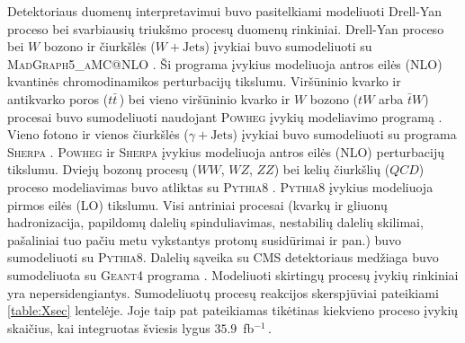 \documentclass[a4paper, 12pt, oneside]{article}
\newcommand{\ZZ}{Z\! Z}
\newcommand{\WZ}{W\! Z}
\newcommand{\tbarW}{\bar{t}W}
\newcommand{\gJets}{\gamma\! +\!\mathrm{Jets}}
\newcommand{\WJets}{W\! +\!\mathrm{Jets}}
\newcommand{\invfb}{fb$^{-1}\,$}
\newcommand{\QCD}{QC\! D}
\begin{document}
Detektoriaus duomenų interpretavimui buvo pasitelkiami modeliuoti Drell-Yan proceso bei svarbiausių triukšmo
procesų duomenų rinkiniai.
Drell-Yan proceso bei $W$ bozono ir čiurkšlės ($\WJets$) įvykiai buvo sumodeliuoti su
\textsc{MadGraph5\_aMC@NLO} \cite{MG_aMCatNLO}.
Ši programa įvykius modeliuoja antros eilės (NLO) kvantinės chromodinamikos perturbacijų tikslumu.
Viršūninio kvarko ir antikvarko poros ($t\bar{t}\,$) bei vieno viršūninio kvarko ir $W$ bozono ($tW$ arba
$\tbarW$) procesai buvo sumodeliuoti naudojant \textsc{Powheg} įvykių modeliavimo programą \cite{powheg_ttbar, powheg_tW}.
Vieno fotono ir vienos čiurkšlės ($\gJets$) įvykiai buvo sumodeliuoti su programa \textsc{Sherpa} \cite{Sherpa}.
\textsc{Powheg} ir \textsc{Sherpa} įvykius modeliuoja antros eilės (NLO) perturbacijų tikslumu.
Dviejų bozonų procesų ($WW$, $\WZ$, $\ZZ$) bei kelių čiurkšlių ($\QCD$) proceso modeliavimas buvo atliktas su
\textsc{Pythia8} \cite{pythia82}.
\textsc{Pythia8} įvykius modeliuoja pirmos eilės (LO) tikslumu.
Visi antriniai procesai (kvarkų ir gliuonų hadronizacija, papildomų dalelių
spinduliavimas, nestabilių dalelių skilimai, pašaliniai tuo pačiu metu vykstantys protonų susidūrimai ir pan.)
buvo sumodeliuoti su \textsc{Pythia8}.
Dalelių sąveika su CMS detektoriaus medžiaga buvo sumodeliuota su \textsc{Geant4} programa
\cite{geant4}.
Modeliuoti skirtingų procesų įvykių rinkiniai yra nepersidengiantys.
Sumodeliuotų procesų reakcijos skerspjūviai pateikiami \ref{table:Xsec} lentelėje.
Joje taip pat pateikiamas tikėtinas kiekvieno proceso įvykių skaičius, kai integruotas šviesis lygus $35.9$~\invfb.
\end{document}
